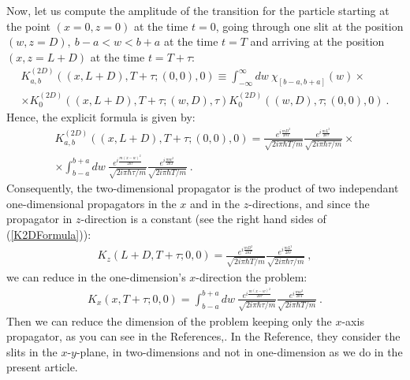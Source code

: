 \documentclass[12pt]{article}   %
\begin{document}
Now, let us compute the amplitude of the transition for the particle 
starting at the point $(x=0,z=0)$ at the time $t=0$,
going through one slit at the position $(w,z=D),\ b-a<w<b+a$ at the time $t=T$
and arriving at the position $(x,z=L+D)$ at the time $t=T+\tau$: 
\begin{multline*}
K_{a,b}^{(2D)}((x,L+D),T+\tau; (0,0),0)
\equiv\int_{-\infty}^{\infty}dw\ \chi_{[b-a,b+a]}(w)\times
\\ \times K_0^{(2D)}\!\!\left((x,L+D),T+\tau;(w,D),\tau\right)K_0^{(2D)}\!\!\left((w,D),\tau;(0,0),0\right)\ .
\end{multline*}
Hence, the explicit formula is given by:
\begin{multline}\label{K2DFormula}
K_{a,b}^{(2D)}((x,L+D), T+\tau;(0,0),0)=
\frac{e^{i\frac{mD^2}{2\hbar T}}}{\sqrt{2i\pi\hbar T/m}} 
\frac{e^{i\frac{m L^2}{2\hbar\tau}}}{\sqrt{2i\pi\hbar\tau/m}} \times\\
\times \int_{b-a}^{b+a}dw\ \frac{e^{i\frac{m (x-w)^2}{2\hbar\tau}}}{\sqrt{2i\pi\hbar\tau/m}}
\frac{e^{i\frac{m w^2}{2\hbar T}}}{\sqrt{2i\pi\hbar T/m}}\ .
\end{multline}
Consequently, the two-dimensional propagator is the product of two independant 
one-dimensional propagators in the $x$ and in the $z$-directions, 
and since the propagator in $z$-direction is a constant 
(see the right hand sides of (\ref{K2DFormula})):
\begin{eqnarray}\label{Kz}
K_z(L+D,T+\tau;0,0)=\frac{e^{i\frac{mD^2}{2\hbar T}}}{\sqrt{2i\pi\hbar T/m}}
\frac{e^{i\frac{m L^2}{2\hbar\tau}}}{\sqrt{2i\pi\hbar\tau/m}}\ ,
\end{eqnarray}
we can reduce in the one-dimension's $x$-direction the problem:
\begin{eqnarray}\label{Kx}
K_x(x,T+\tau;0,0)=\int_{b-a}^{b+a}dw\ \frac{e^{i\frac{m (x-w)^2}{2\hbar\tau}}}{\sqrt{2i\pi\hbar\tau/m}}
\frac{e^{i\frac{m w^2}{2\hbar T}}}{\sqrt{2i\pi\hbar T/m}}\ .
\end{eqnarray}
Then we can reduce the dimension of the problem keeping only the $x$-axis
propagator, as you can see in the References\cite{FH},\cite{Frabboni}.
In the Reference,\cite{Frabboni} they consider the slits in 
the $x$-$y$-plane, in two-dimensions and not in one-dimension 
as we do in the present article.
\end{document}
